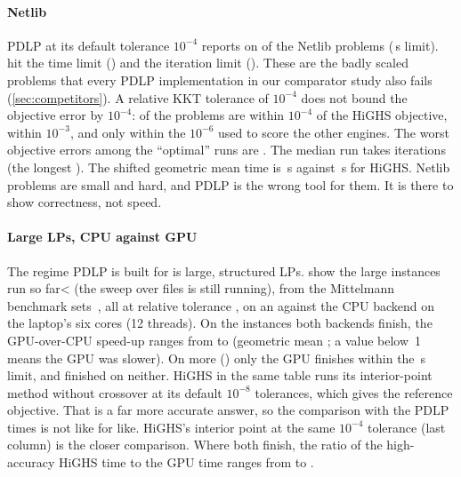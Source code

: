 \paragraph{Netlib} PDLP at its default tolerance $10^{-4}$ reports  on \nPdlp{} of the
\nPdlpTot{} Netlib problems (\tlPdlp\,s limit). \nPdlpTimeLimit{} hit the time limit
(\pdlpTimeLimitNames) and \nPdlpIterLimit{} the iteration limit (\pdlpIterLimitNames). These are
the badly scaled problems that every PDLP implementation in our comparator study also fails
(\cref{sec:competitors}). A relative KKT tolerance of $10^{-4}$ does not bound the objective error by
$10^{-4}$: \nPdlpTight{} of the problems are within $10^{-4}$ of the HiGHS objective,
\nPdlpLoose{} within $10^{-3}$, and only \nPdlpStrict{} within the $10^{-6}$ used to score the other
engines. The worst objective errors among the ``optimal'' runs are \pdlpWorst. The median run takes
\medItPdlp{} iterations (the longest \maxItPdlp). The shifted geometric mean time is \sgmPdlp\,s
against \sgmPdlpRef\,s for HiGHS. Netlib problems are small and hard, and PDLP is the wrong tool for
them. It is there to show correctness, not speed.

\ifnum{}
\paragraph{Large LPs, CPU against GPU}
The regime PDLP is built for is large, structured LPs.  show the
\nLarge{} large instances run so far\ifnum\nLarge<\nLargeList{} (the sweep over \nLargeList{} files is
still running)\fi, from the Mittelmann benchmark sets~\cite{mittelmann}, all at relative tolerance
\largeTol{}, on an \largeGpuHw{} against the CPU backend on the laptop's six cores (12 threads). On
the \nLargeBothOk{} instances both backends finish, the GPU-over-CPU speed-up ranges from
\largeSpeedMin{} to \largeSpeedMax{} (geometric mean \largeSpeedGm; a value below~1 means the GPU was
slower). On \nLargeGpuOnly{} more
(\largeGpuOnlyNames) only the GPU finishes within the \largeLimit\,s limit, and \nLargeNeither{}
finished on neither. HiGHS in the same table runs its interior-point method without crossover at its
default $10^{-8}$ tolerances, which gives the reference objective. That is a far more accurate answer,
so the comparison with the PDLP times is not like for like. HiGHS's interior point at the same
$10^{-4}$ tolerance (last column) is the closer comparison. Where both finish, the ratio of the
high-accuracy HiGHS time to the GPU time ranges from \largeVsHighsMin{} to \largeVsHighsMax.

